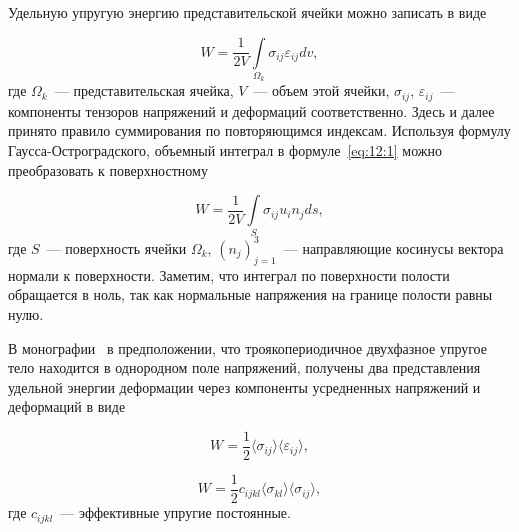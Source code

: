 
Удельную упругую энергию представительской ячейки можно записать в виде

\begin{equation}
W=\frac{1}{2V}\int\limits_{\Omega_k}\sigma_{ij}\varepsilon_{ij}dv,
\label{eq:12:1}
\end{equation}
где $\Omega_k$~--- представительская ячейка, $V$~--- объем этой ячейки, $\sigma_{ij}$, $\varepsilon_{ij}$~--- компоненты тензоров напряжений и деформаций соответственно. Здесь и далее принято правило суммирования по повторяющимся индексам. Используя формулу Гаусса-Остроградского, объемный интеграл в формуле~\eqref{eq:12:1} можно преобразовать к поверхностному

\begin{equation}
W=\frac{1}{2V}\int\limits_S\sigma_{ij}u_i n_j ds,
\label{eq:12:2}
\end{equation}
где $S$~--- поверхность ячейки $\Omega_k$, $(n_j)_{j=1}^3$~--- направляющие косинусы вектора нормали к поверхности. Заметим, что интеграл по поверхности полости обращается в ноль, так как нормальные напряжения на границе полости равны нулю.
 
В монографии~\cite{Vanin1985} в предположении, что троякопериодичное двухфазное упругое тело находится в однородном поле напряжений, получены два представления удельной энергии деформации через компоненты усредненных напряжений и деформаций в виде

\begin{equation}
W=\frac{1}{2}\langle\sigma_{ij}\rangle\langle\varepsilon_{ij}\rangle,
\label{eq:12:3}
\end{equation}

\begin{equation}
W=\frac{1}{2}c_{ijkl}\langle\sigma_{kl}\rangle\langle\sigma_{ij}\rangle,
\label{eq:12:4}
\end{equation}
где $c_{ijkl}$~--- эффективные упругие постоянные.

